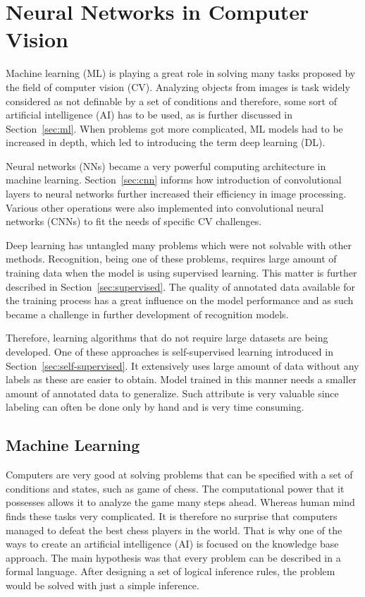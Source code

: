 \chapter{\label{chap:nn-in-cv}Neural Networks in Computer Vision}

Machine learning (ML) is playing a great role in solving many tasks proposed by the field of computer vision (CV). Analyzing objects from images is task widely considered as not definable by a set of conditions and therefore, some sort of artificial intelligence (AI) has to be used, as is further discussed in Section~\ref{sec:ml}. When problems got more complicated, ML models had to be increased in depth, which led to introducing the term deep learning (DL). 

Neural networks (NNs) became a very powerful computing architecture in machine learning. Section~\ref{sec:cnn} informs how introduction of convolutional layers to neural networks further increased their efficiency in image processing. Various other operations were also implemented into convolutional neural networks (CNNs) to fit the needs of specific CV challenges.

Deep learning has untangled many problems which were not solvable with other methods. Recognition, being one of these problems, requires large amount of training data when the model is using supervised learning. This matter is further described in Section~\ref{sec:supervised}. The quality of annotated data available for the training process has a great influence on the model performance and as such became a challenge in further development of recognition models.

Therefore, learning algorithms that do not require large datasets are being developed. One of these approaches is self-supervised learning introduced in Section~\ref{sec:self-supervised}. It extensively uses large amount of data without any labels as these are easier to obtain. Model trained in this manner needs a smaller amount of annotated data to generalize. Such attribute is very valuable since labeling can often be done only by hand and is very time consuming.

\section{\label{sec:ml}Machine Learning}

Computers are very good at solving problems that can be specified with a set of conditions and states, such as game of chess. The computational power that it possesses allows it to analyze the game many steps ahead. Whereas human mind finds these tasks very complicated. It is therefore no surprise that computers managed to defeat the best chess players in the world. That is why one of the ways to create an artificial intelligence (AI) is focused on the knowledge base approach. The main hypothesis was that every problem can be described in a formal language. After designing a set of logical inference rules, the problem would be solved with just a simple inference.

